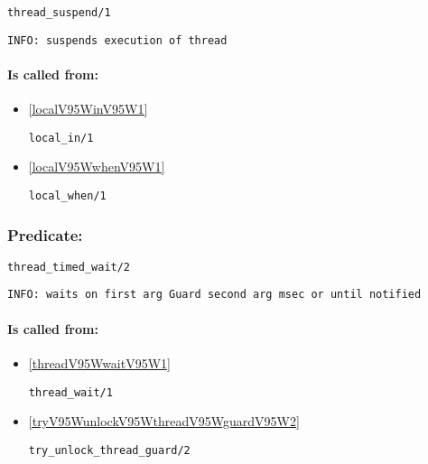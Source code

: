 \begin{verbatim}
thread_suspend/1
\end{verbatim}

{\small \begin{verbatim}
INFO: suspends execution of thread

\end{verbatim}}
\paragraph{Is called from:} 
\begin{itemize}
\item \ref{localV95WinV95W1} 
\begin{verbatim}
local_in/1
\end{verbatim}

\item \ref{localV95WwhenV95W1} 
\begin{verbatim}
local_when/1
\end{verbatim}

\end{itemize}

\subsubsection{Predicate:} \label{threadV95WtimedV95WwaitV95W2}

\begin{verbatim}
thread_timed_wait/2
\end{verbatim}

{\small \begin{verbatim}
INFO: waits on first arg Guard second arg msec or until notified

\end{verbatim}}
\paragraph{Is called from:} 
\begin{itemize}
\item \ref{threadV95WwaitV95W1} 
\begin{verbatim}
thread_wait/1
\end{verbatim}

\item \ref{tryV95WunlockV95WthreadV95WguardV95W2} 
\begin{verbatim}
try_unlock_thread_guard/2
\end{verbatim}

\end{itemize}

